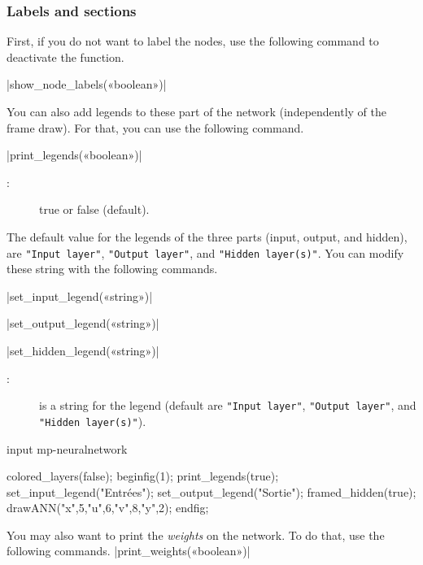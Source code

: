 \documentclass[english]{ltxdoc}
\begin{document}
\subsubsection{Labels and sections}


First, if you do not want to label the nodes, use the following command to
deactivate the function.  

\commande|show_node_labels(«boolean»)|\smallskip{}

You can also add legends to these part of the network (independently of the
frame draw). For that, you can use the following command.  

\commande|print_legends(«boolean»)|\smallskip{}
\begin{description}
  \item[:] true or false (default).
\end{description}

The default value for the legends of the three parts (input, output, and
hidden), are \lstinline+"Input layer"+, \lstinline+"Output layer"+, and
\lstinline+"Hidden layer(s)"+. You can modify these string with the following
commands. 


\commande|set_input_legend(«string»)|\smallskip{}

\commande|set_output_legend(«string»)|\smallskip{}

\commande|set_hidden_legend(«string»)|\smallskip{}


\begin{description}
  \item[:] is a string for the legend (default are \lstinline+"Input layer"+, \lstinline+"Output layer"+, and
  \lstinline+"Hidden layer(s)"+). 
\end{description}


\begin{ExempleMP}
input mp-neuralnetwork

colored_layers(false);
beginfig(1);
print_legends(true);
set_input_legend("Entrées");
set_output_legend("Sortie");
framed_hidden(true); 
drawANN("x",5,"u",6,"v",8,"y",2);
endfig;
\end{ExempleMP}

You may also want to print the \emph{weights} on the network. To do that, use
the following commands. 
\commande|print_weights(«boolean»)|\smallskip{}
\end{document}

